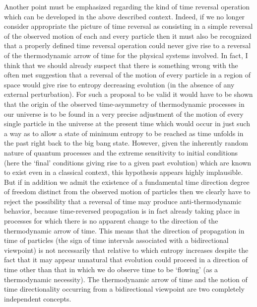 \documentclass[notitlepage,12pt]{report}
\begin{document}
Another point must be emphasized regarding the kind of time reversal operation which can be developed in the above described context. Indeed, if we no longer consider appropriate the picture of time reversal as consisting in a simple reversal of the observed motion of each and every particle then it must also be recognized that a properly defined time reversal operation could never give rise to a reversal of the thermodynamic arrow of time for the physical systems involved. In fact, I think that we should already suspect that there is something wrong with the often met suggestion that a reversal of the motion of every particle in a region of space would give rise to entropy decreasing evolution (in the absence of any external perturbation). For such a proposal to be valid it would have to be shown that the origin of the observed time-asymmetry of thermodynamic processes in our universe is to be found in a very precise adjustment of the motion of every single particle in the universe at the present time which would occur in just such a way as to allow a state of minimum entropy to be reached as time unfolds in the past right back to the big bang state. However, given the inherently random nature of quantum processes and the extreme sensitivity to initial conditions (here the `final' conditions giving rise to a given past evolution) which are known to exist even in a classical context, this hypothesis appears highly implausible. But if in addition we admit the existence of a fundamental time direction degree of freedom distinct from the observed motion of particles then we clearly have to reject the possibility that a reversal of time may produce anti-thermodynamic behavior, because time-reversed propagation is in fact already taking place in processes for which there is no apparent change to the direction of the thermodynamic arrow of time. This means that the direction of propagation in time of particles (the sign of time intervals associated with a bidirectional viewpoint) is not necessarily that relative to which entropy increases despite the fact that it may appear unnatural that evolution could proceed in a direction of time other than that in which we do observe time to be `flowing' (as a thermodynamic necessity). The thermodynamic arrow of time and the notion of time directionality occurring from a bidirectional viewpoint are two completely independent concepts.
\end{document}
